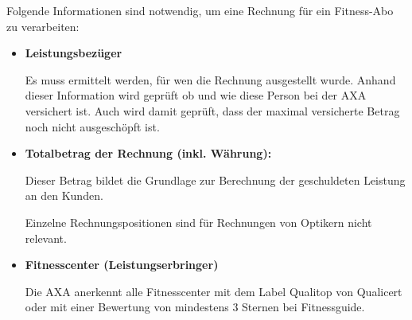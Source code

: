 

%    
%    
%    
%    

Folgende Informationen sind notwendig, um eine Rechnung für ein Fitness-Abo zu verarbeiten:

\begin{itemize}
    \item \textbf{Leistungsbezüger}
    
    Es muss ermittelt werden, für wen die Rechnung ausgestellt wurde. Anhand dieser Information wird geprüft ob und wie diese Person bei der AXA versichert ist. Auch wird damit geprüft, dass der maximal versicherte Betrag noch nicht ausgeschöpft ist.
    \item \textbf{Totalbetrag der Rechnung (inkl. Währung):}
    
    Dieser Betrag bildet die Grundlage zur Berechnung der geschuldeten Leistung an den Kunden. 
    
    Einzelne Rechnungspositionen sind für Rechnungen von Optikern nicht relevant.
    \item \textbf{Fitnesscenter (Leistungserbringer)}
    
    Die AXA anerkennt alle Fitnesscenter mit dem Label Qualitop von Qualicert oder mit einer Bewertung von mindestens 3 Sternen bei Fitnessguide.
\end{itemize}

